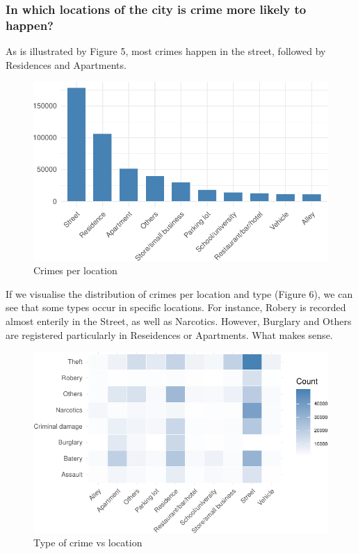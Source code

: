 \documentclass[]{article}
\begin{document}
\pagebreak

\subsubsection{In which locations of the city is crime more likely to
happen?}\label{in-which-locations-of-the-city-is-crime-more-likely-to-happen}

As is illustrated by Figure 5, most crimes happen in the street,
followed by Residences and Apartments.

\begin{figure}[H]

{\centering \includegraphics{201081646_MATH5741M_files/figure-latex/fig5-1} 

}

\caption{Crimes per location}\label{fig:fig5}
\end{figure}

If we visualise the distribution of crimes per location and type (Figure
6), we can see that some types occur in specific locations. For
instance, Robery is recorded almost enterily in the Street, as well as
Narcotics. However, Burglary and Others are registered particularly in
Reseidences or Apartments. What makes sense.

\begin{figure}[H]

{\centering \includegraphics{201081646_MATH5741M_files/figure-latex/fig6-1} 

}

\caption{Type of crime vs location}\label{fig:fig6}
\end{figure}
\end{document}
